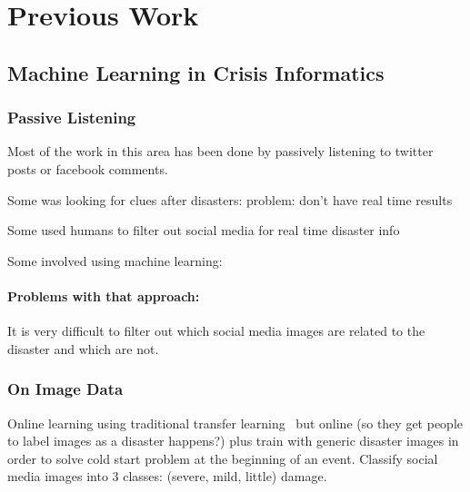 \chapter{Previous Work} 

\section{Machine Learning in Crisis Informatics}

\subsection{Passive Listening}
Most of the work in this area has been done by passively listening to twitter
posts or facebook comments. 

Some was looking for clues after disasters: 
\cite{viewegMicrobloggingTwoNatural2010}
problem: don't have real time results

Some used humans to filter out social media for real time disaster info
\cite{starbirdVoluntweetersSelforganizingDigital}
\cite{meierDigitalHumanitariansHow2015}

Some involved using machine learning:
\cite{imranPracticalExtractionDisasterrelevant2013}

\subsubsection{Problems with that approach:}
It is very difficult to filter out which social media images are related to the
disaster and which are not.

\subsection{On Image Data}
Online learning using traditional transfer
learning~\cite{donahueDeCAFDeepConvolutional2013} but online (so they get people
to label images as a disaster happens?) plus train with generic disaster
images in order to solve cold start problem at the beginning of an event.
Classify social media images into 3 classes: (severe, mild, little) damage.
\cite{nguyenDamageAssessmentSocial2017}



